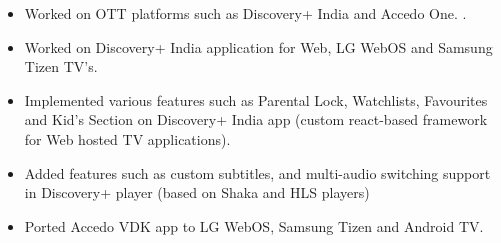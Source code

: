 \documentclass[10pt,a4paper,ragged2e]{maltacv}
\begin{document}


\makecvheader


\begin{itemize}
  \item Worked on OTT platforms such as Discovery+ India and Accedo One. . 
  \item Worked on Discovery+ India application for Web, LG WebOS and Samsung Tizen TV's.  
  \item Implemented various features such as Parental Lock, Watchlists, Favourites and Kid's Section on Discovery+ India app (custom react-based framework for Web hosted TV applications).
  \item Added features such as custom subtitles, and multi-audio switching support in Discovery+ player (based on Shaka and HLS players)
  \item Ported Accedo VDK app to LG WebOS, Samsung Tizen and Android TV. 
\end{itemize}
\end{document}
